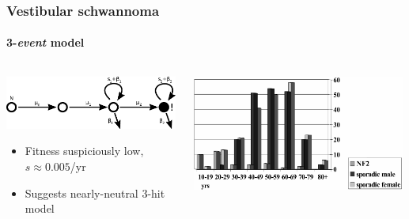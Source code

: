 \documentclass{beamer}
\begin{document}
\begin{frame}
    \frametitle{Vestibular schwannoma}
    \framesubtitle{3-\emph{event} model}

    \begin{columns}
        \begin{column}{0.5\textwidth}
        \includegraphics[width=0.99\textwidth]{figures/diagram3}

        \begin{itemize}
            \item Fitness suspiciously low, $s \approx 0.005$/yr
            \footnotemark[1]
            \item Suggests nearly-neutral 3-hit model
            \footnotemark[3]
        \end{itemize}
        \end{column}
        \begin{column}{0.5\textwidth}
        \includegraphics[width=0.99\textwidth]{figures/DGREvans2005}
        \end{column}
    \end{columns}

\end{frame}
\end{document}
